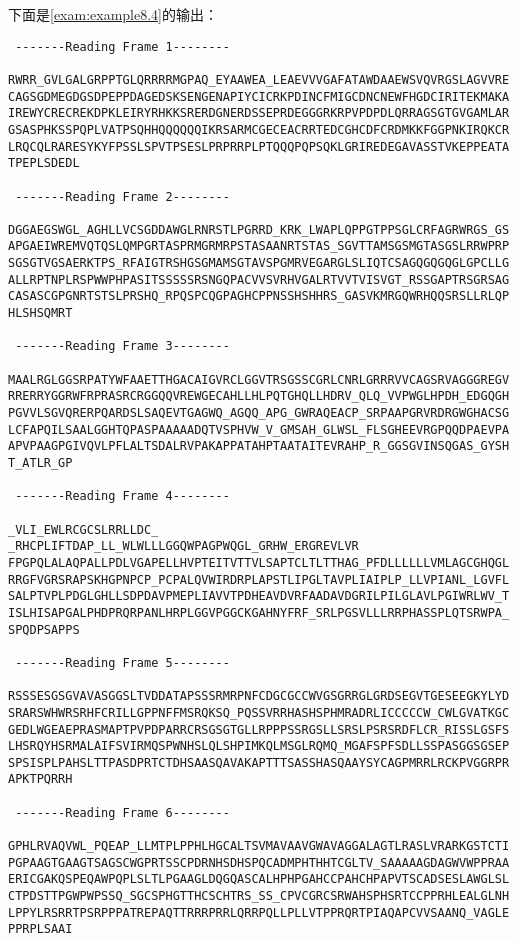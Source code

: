 下面是\autoref{exam:example8.4}的输出：

\begin{lstlisting}
 -------Reading Frame 1--------

RWRR_GVLGALGRPPTGLQRRRRMGPAQ_EYAAWEA_LEAEVVVGAFATAWDAAEWSVQVRGSLAGVVRE
CAGSGDMEGDGSDPEPPDAGEDSKSENGENAPIYCICRKPDINCFMIGCDNCNEWFHGDCIRITEKMAKA
IREWYCRECREKDPKLEIRYRHKKSRERDGNERDSSEPRDEGGGRKRPVPDPDLQRRAGSGTGVGAMLAR
GSASPHKSSPQPLVATPSQHHQQQQQQIKRSARMCGECEACRRTEDCGHCDFCRDMKKFGGPNKIRQKCR
LRQCQLRARESYKYFPSSLSPVTPSESLPRPRRPLPTQQQPQPSQKLGRIREDEGAVASSTVKEPPEATA
TPEPLSDEDL

 -------Reading Frame 2--------

DGGAEGSWGL_AGHLLVCSGDDAWGLRNRSTLPGRRD_KRK_LWAPLQPPGTPPSGLCRFAGRWRGS_GS
APGAEIWREMVQTQSLQMPGRTASPRMGRMRPSTASAANRTSTAS_SGVTTAMSGSMGTASGSLRRWPRP
SGSGTVGSAERKTPS_RFAIGTRSHGSGMAMSGTAVSPGMRVEGARGLSLIQTCSAGQGQGQGLGPCLLG
ALLRPTNPLRSPWWPHPASITSSSSSRSNGQPACVVSVRHVGALRTVVTVISVGT_RSSGAPTRSGRSAG
CASASCGPGNRTSTSLPRSHQ_RPQSPCQGPAGHCPPNSSHSHHRS_GASVKMRGQWRHQQSRSLLRLQP
HLSHSQMRT

 -------Reading Frame 3--------

MAALRGLGGSRPATYWFAAETTHGACAIGVRCLGGVTRSGSSCGRLCNRLGRRRVVCAGSRVAGGGREGV
RRERRYGGRWFRPRASRCRGGQQVREWGECAHLLHLPQTGHQLLHDRV_QLQ_VVPWGLHPDH_EDGQGH
PGVVLSGVQRERPQARDSLSAQEVTGAGWQ_AGQQ_APG_GWRAQEACP_SRPAAPGRVRDRGWGHACSG
LCFAPQILSAALGGHTQPASPAAAAADQTVSPHVW_V_GMSAH_GLWSL_FLSGHEEVRGPQQDPAEVPA
APVPAAGPGIVQVLPFLALTSDALRVPAKAPPATAHPTAATAITEVRAHP_R_GGSGVINSQGAS_GYSH
T_ATLR_GP

 -------Reading Frame 4--------

_VLI_EWLRCGCSLRRLLDC_  _RHCPLIFTDAP_LL_WLWLLLGGQWPAGPWQGL_GRHW_ERGREVLVR
FPGPQLALAQPALLPDLVGAPELLHVPTEITVTTVLSAPTCLTLTTHAG_PFDLLLLLLVMLAGCGHQGL
RRGFVGRSRAPSKHGPNPCP_PCPALQVWIRDRPLAPSTLIPGLTAVPLIAIPLP_LLVPIANL_LGVFL
SALPTVPLPDGLGHLLSDPDAVPMEPLIAVVTPDHEAVDVRFAADAVDGRILPILGLAVLPGIWRLWV_T
ISLHISAPGALPHDPRQRPANLHRPLGGVPGGCKGAHNYFRF_SRLPGSVLLLRRPHASSPLQTSRWPA_
SPQDPSAPPS

 -------Reading Frame 5--------

RSSSESGSGVAVASGGSLTVDDATAPSSSRMRPNFCDGCGCCWVGSGRRGLGRDSEGVTGESEEGKYLYD
SRARSWHWRSRHFCRILLGPPNFFMSRQKSQ_PQSSVRRHASHSPHMRADRLICCCCCW_CWLGVATKGC
GEDLWGEAEPRASMAPTPVPDPARRCRSGSGTGLLRPPPSSRGSLLSRSLPSRSRDFLCR_RISSLGSFS
LHSRQYHSRMALAIFSVIRMQSPWNHSLQLSHPIMKQLMSGLRQMQ_MGAFSPFSDLLSSPASGGSGSEP
SPSISPLPAHSLTTPASDPRTCTDHSAASQAVAKAPTTTSASSHASQAAYSYCAGPMRRLRCKPVGGRPR
APKTPQRRH

 -------Reading Frame 6--------

GPHLRVAQVWL_PQEAP_LLMTPLPPHLHGCALTSVMAVAAVGWAVAGGALAGTLRASLVRARKGSTCTI
PGPAAGTGAAGTSAGSCWGPRTSSCPDRNHSDHSPQCADMPHTHHTCGLTV_SAAAAAGDAGWVWPPRAA
ERICGAKQSPEQAWPQPLSLTLPGAAGLDQGQASCALHPHPGAHCCPAHCHPAPVTSCADSESLAWGLSL
CTPDSTTPGWPWPSSQ_SGCSPHGTTHCSCHTRS_SS_CPVCGRCSRWAHSPHSRTCCPPRHLEALGLNH
LPPYLRSRRTPSRPPPATREPAQTTRRRPRRLQRRPQLLPLLVTPPRQRTPIAQAPCVVSAANQ_VAGLE
PPRPLSAAI
\end{lstlisting}

